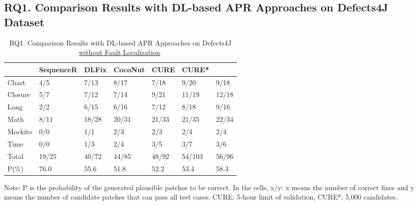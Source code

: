\subsection{\bf RQ1. Comparison Results with DL-based APR Approaches on Defects4J Dataset}

\begin{table}[t]
  \caption{RQ1. Comparison Results with DL-based APR Approaches on Defects4J \underline {without Fault Localization}.}
  \vspace{-6pt}
  {\small
			\begin{center}
				\renewcommand{\arraystretch}{1}
				\begin{tabular}{p{0.8cm}<{\centering}|p{1.2cm}<{\centering}|p{0.9cm}<{\centering}|p{1cm}<{\centering}|p{0.8cm}<{\centering}|p{0.8cm}<{\centering}|p{0.8cm}<{\centering}}
					
					\hline
					&\textbf{SequenceR}&\textbf{DLFix}& \textbf{CocoNut}&\textbf{CURE}&\textbf{CURE*}&\textbf{\tool}\\
					\hline
					Chart  & 4/5   & 7/13  & 8/17  & 7/18  & 9/20  & 9/18\\
					Closure& 5/7   & 7/12  & 7/14  & 9/21 & 11/19  & 12/18\\
					Lang   & 2/2   & 6/15  & 6/16  & 7/12 & 8/18  & 9/16\\
					Math    & 8/11  & 18/28 & 20/31 & 21/33 & 21/35 & 22/34\\
					Mockito & 0/0   & 1/1   & 2/3   & 2/3  &2/4  & 2/4\\
					Time    & 0/0   & 1/3   & 2/4   & 3/5  &3/7  & 3/6\\
					\hline
					Total   & 19/25 & 40/72 & 44/85 & 48/92 & 54/103 & 56/96\\
					\hline
					P(\%)  & 76.0  & 55.6  & 51.8  & 52.2  &  53.4 & 58.3\\
					\hline
				\end{tabular}
			{\footnotesize{
				Note: P is the probability of the generated plausible patches to be correct. In the cells, x/y: x means the number of correct fixes and y means the number of candidate patches that can pass all test cases. CURE: 5-hour limit of validation, CURE*: 5,000 candidates.}}

				\label{RQ1_defect4j}
			\end{center}
                }
		\end{table}

